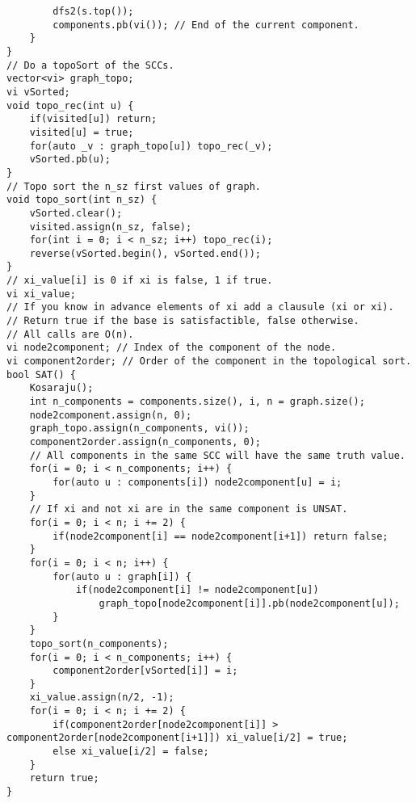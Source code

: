 \documentclass[a4paper,10pt]{article}
\begin{document}
\begin{multicols}{2}
\begin{verbatim}
        dfs2(s.top());
        components.pb(vi()); // End of the current component.
    }
}
// Do a topoSort of the SCCs.
vector<vi> graph_topo;
vi vSorted;
void topo_rec(int u) {
    if(visited[u]) return;
    visited[u] = true;
    for(auto _v : graph_topo[u]) topo_rec(_v);
    vSorted.pb(u);
}
// Topo sort the n_sz first values of graph.
void topo_sort(int n_sz) {
    vSorted.clear(); 
    visited.assign(n_sz, false);
    for(int i = 0; i < n_sz; i++) topo_rec(i);
    reverse(vSorted.begin(), vSorted.end());
}
// xi_value[i] is 0 if xi is false, 1 if true. 
vi xi_value;
// If you know in advance elements of xi add a clausule (xi or xi).
// Return true if the base is satisfactible, false otherwise.
// All calls are O(n).
vi node2component; // Index of the component of the node.
vi component2order; // Order of the component in the topological sort.
bool SAT() {
    Kosaraju();
    int n_components = components.size(), i, n = graph.size();
    node2component.assign(n, 0);
    graph_topo.assign(n_components, vi());
    component2order.assign(n_components, 0);
    // All components in the same SCC will have the same truth value.
    for(i = 0; i < n_components; i++) {
        for(auto u : components[i]) node2component[u] = i;
    }
    // If xi and not xi are in the same component is UNSAT.
    for(i = 0; i < n; i += 2) {
        if(node2component[i] == node2component[i+1]) return false;
    }
    for(i = 0; i < n; i++) {
        for(auto u : graph[i]) {
            if(node2component[i] != node2component[u])
                graph_topo[node2component[i]].pb(node2component[u]);
        }
    }
    topo_sort(n_components);
    for(i = 0; i < n_components; i++) {
        component2order[vSorted[i]] = i;
    }
    xi_value.assign(n/2, -1);
    for(i = 0; i < n; i += 2) {
        if(component2order[node2component[i]] > component2order[node2component[i+1]]) xi_value[i/2] = true;
        else xi_value[i/2] = false;
    }
    return true;
}
\end{verbatim}
\end{multicols}
\end{document}
